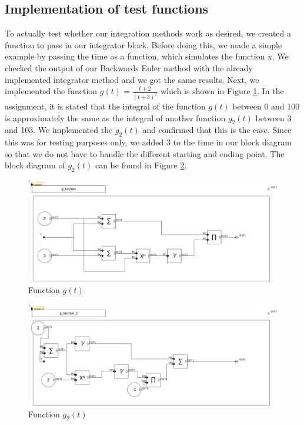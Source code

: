 \documentclass{article}
\begin{document}
\subsection{Implementation of test functions}

To actually test whether our integration methods work as desired, we created a function to pass in our integrator block. Before doing this, we made a simple example by passing the time as a function, which simulates the function x. We checked the output of our Backwards Euler method with the already implemented integrator method and we got the same results. Next, we implemented the function $g(t) = \frac{t + 2}{(t + 3)^2}$ which is shown in Figure \ref{fig:g_function}. In the assignment, it is stated that the integral of the function $g(t)$ between 0 and 100 is approximately the same as the integral of another function $g_2(t)$ between 3 and 103. We implemented the $g_2(t)$ and confirmed that this is the case. Since this was for testing purposes only, we added 3 to the time in our block diagram so that we do not have to handle the different starting and ending point. The block diagram of $g_2(t)$ can be found in Figure \ref{fig:g_2_function}.\\

\begin{figure}
    \centering
    \includegraphics[width=0.75\linewidth]{Images/g_Function.drawio.png}
    \caption{Function $g(t)$}
    \label{fig:g_function}
\end{figure}

\begin{figure}
    \centering
    \includegraphics[width=0.75\linewidth]{Images/g_Function_2.drawio.png}
    \caption{Function $g_2(t)$}
    \label{fig:g_2_function}
\end{figure}
\end{document}
